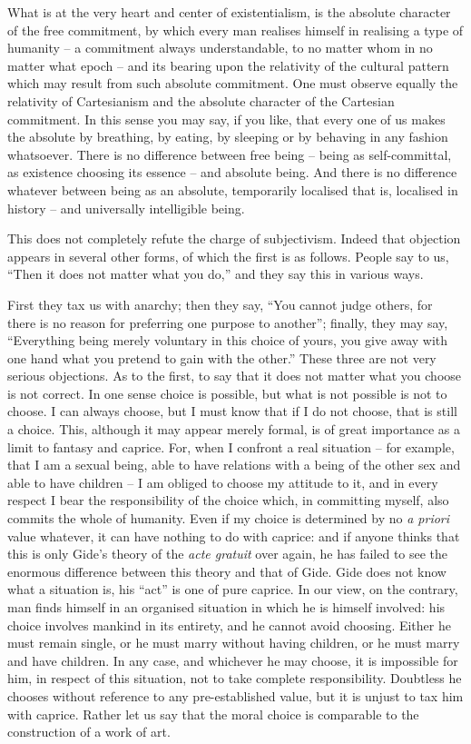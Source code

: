 \documentclass[12pt]{article}
\begin{document}
What is at the very heart and center of existentialism, is the absolute character of the free commitment, by which every man realises himself in realising a type of humanity – a commitment always understandable, to no matter whom in no matter what epoch – and its bearing upon the relativity of the cultural pattern which may result from such absolute commitment. One must observe equally the relativity of Cartesianism and the absolute character of the Cartesian commitment. In this sense you may say, if you like, that every one of us makes the absolute by breathing, by eating, by sleeping or by behaving in any fashion whatsoever. There is no difference between free being – being as self-committal, as existence choosing its essence – and absolute being. And there is no difference whatever between being as an absolute, temporarily localised that is, localised in history – and universally intelligible being.

This does not completely refute the charge of subjectivism. Indeed that objection appears in several other forms, of which the first is as follows. People say to us, “Then it does not matter what you do,” and they say this in various ways.

First they tax us with anarchy; then they say, “You cannot judge others, for there is no reason for preferring one purpose to another”; finally, they may say, “Everything being merely voluntary in this choice of yours, you give away with one hand what you pretend to gain with the other.” These three are not very serious objections. As to the first, to say that it does not matter what you choose is not correct. In one sense choice is possible, but what is not possible is not to choose. I can always choose, but I must know that if I do not choose, that is still a choice. This, although it may appear merely formal, is of great importance as a limit to fantasy and caprice. For, when I confront a real situation – for example, that I am a sexual being, able to have relations with a being of the other sex and able to have children – I am obliged to choose my attitude to it, and in every respect I bear the responsibility of the choice which, in committing myself, also commits the whole of humanity. Even if my choice is determined by no \textit{a priori} value whatever, it can have nothing to do with caprice: and if anyone thinks that this is only Gide’s theory of the \textit{acte gratuit} over again, he has failed to see the enormous difference between this theory and that of Gide. Gide does not know what a situation is, his “act” is one of pure caprice. In our view, on the contrary, man finds himself in an organised situation in which he is himself involved: his choice involves mankind in its entirety, and he cannot avoid choosing. Either he must remain single, or he must marry without having children, or he must marry and have children. In any case, and whichever he may choose, it is impossible for him, in respect of this situation, not to take complete responsibility. Doubtless he chooses without reference to any pre-established value, but it is unjust to tax him with caprice. Rather let us say that the moral choice is comparable to the construction of a work of art.
\end{document}
